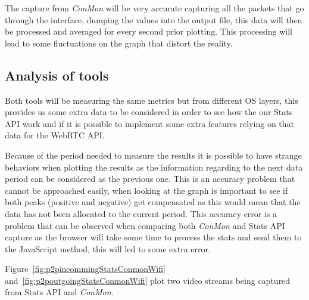 The capture from {\it ConMon} will be very accurate capturing all the packets that go through the interface, dumping the values into the output file, this data will then be processed and averaged for every second prior plotting. This processing will lead to some fluctuations on the graph that distort the reality.

\subsection{Analysis of tools}

Both tools will be measuring the same metrics but from different OS layers, this provides us some extra data to be considered in order to see how the our Stats API work and if it is possible to implement some extra features relying on that data for the WebRTC API.

Because of the period needed to measure the results it is possible to have strange behaviors when plotting the results as the information regarding to the next data period can be considered as the previous one. This is an accuracy problem that cannot be approached easily, when looking at the graph is important to see if both peaks (positive and negative) get compensated as this would mean that the data has not been allocated to the current period. This accuracy error is a problem that can be observed when comparing both {\it ConMon} and Stats API capture as the browser will take some time to process the stats and send them to the JavaScript method, this will led to some extra error.

Figure~\ref{fig:p2pincommingStatsConmonWifi} and~\ref{fig:p2poutgoingStatsConmonWifi} plot two video streams being captured from Stats API and {\it ConMon}.

